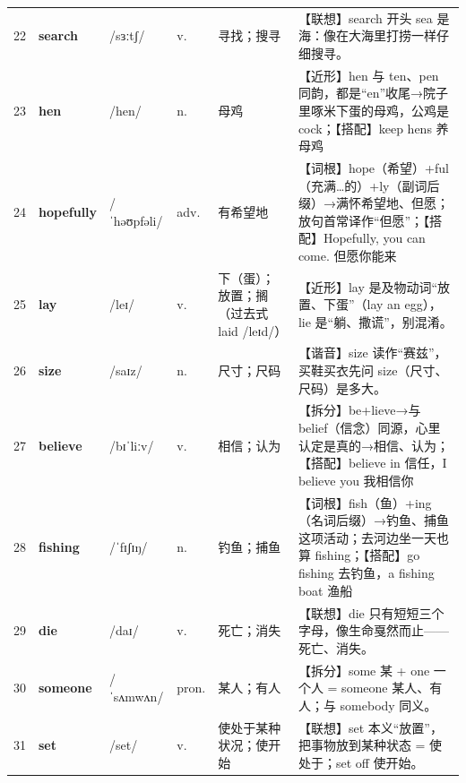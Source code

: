 \documentclass[UTF8,a4paper,11pt,oneside]{ctexbook}
\newcommand{\cellword}[1]{{\bfseries\textcolor{wordcol}{#1}}}
\newcommand{\cellipa}[1]{{\footnotesize\textcolor{ipacol}{#1}}}
\newcommand{\cellpos}[1]{\textcolor{poscol}{#1}}
\newcommand{\cellno}[1]{\textcolor{volcolor!75!black}{#1}}
\begin{document}
{\begin{longtable}{@{}C{0.045\textwidth}L{0.155\textwidth}L{0.175\textwidth}C{0.070\textwidth}L{0.180\textwidth}L{0.282\textwidth}@{}}
\cellno{22} & \cellword{search} & \cellipa{/sɜːtʃ/} & \cellpos{v.} & 寻找；搜寻 & \textcolor{tagAssoc}{【联想】}search 开头 sea 是海：像在大海里打捞一样仔细搜寻。 \\
 \cellno{23} & \cellword{hen} & \cellipa{/hen/} & \cellpos{n.} & 母鸡 & \textcolor{tagNear}{【近形】}hen 与 ten、pen 同韵，都是“en”收尾→\allowbreak{}院子里啄米下蛋的母鸡，公鸡是 cock；\textcolor{tagColloc}{【搭配】}keep hens 养母鸡 \\
\cellno{24} & \cellword{hopefully} & \cellipa{/ˈhəʊpfəli/} & \cellpos{adv.} & 有希望地 & \textcolor{tagRoot}{【词根】}hope（希望）+ful（充满…的）+ly（副词后缀）→\allowbreak{}满怀希望地、但愿；放句首常译作“但愿”；\textcolor{tagColloc}{【搭配】}Hopefully, you can come. 但愿你能来 \\
 \cellno{25} & \cellword{lay} & \cellipa{/leɪ/} & \cellpos{v.} & 下（蛋）；放置；搁（过去式 laid /leɪd/） & \textcolor{tagNear}{【近形】}lay 是及物动词“放置、下蛋”（lay an egg），lie 是“躺、撒谎”，别混淆。 \\
\cellno{26} & \cellword{size} & \cellipa{/saɪz/} & \cellpos{n.} & 尺寸；尺码 & \textcolor{tagSound}{【谐音】}size 读作“赛兹”，买鞋买衣先问 size（尺寸、尺码）是多大。 \\
 \cellno{27} & \cellword{believe} & \cellipa{/bɪˈliːv/} & \cellpos{v.} & 相信；认为 & \textcolor{tagSplit}{【拆分】}be+lieve→\allowbreak{}与 belief（信念）同源，心里认定是真的→\allowbreak{}相信、认为；\textcolor{tagColloc}{【搭配】}believe in 信任，I believe you 我相信你 \\
\cellno{28} & \cellword{fishing} & \cellipa{/ˈfɪʃɪŋ/} & \cellpos{n.} & 钓鱼；捕鱼 & \textcolor{tagRoot}{【词根】}fish（鱼）+ing（名词后缀）→\allowbreak{}钓鱼、捕鱼这项活动；去河边坐一天也算 fishing；\textcolor{tagColloc}{【搭配】}go fishing 去钓鱼，a fishing boat 渔船 \\
 \cellno{29} & \cellword{die} & \cellipa{/daɪ/} & \cellpos{v.} & 死亡；消失 & \textcolor{tagAssoc}{【联想】}die 只有短短三个字母，像生命戛然而止——死亡、消失。 \\
\cellno{30} & \cellword{someone} & \cellipa{/ˈsʌmwʌn/} & \cellpos{pron.} & 某人；有人 & \textcolor{tagSplit}{【拆分】}some 某 + one 一个人 = someone 某人、有人；与 somebody 同义。 \\
 \cellno{31} & \cellword{set} & \cellipa{/set/} & \cellpos{v.} & 使处于某种状况；使开始 & \textcolor{tagAssoc}{【联想】}set 本义“放置”，把事物放到某种状态 = 使处于；set off 使开始。 \\

\end{longtable}}
\end{document}
